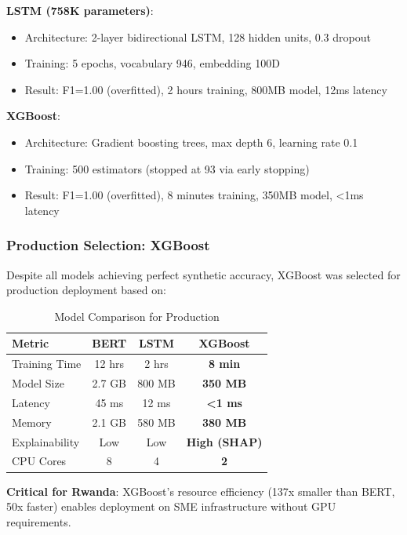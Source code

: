 \documentclass[11pt,conference]{IEEEtran}
\begin{document}
\textbf{LSTM (758K parameters)}:
\begin{itemize}
    \item Architecture: 2-layer bidirectional LSTM, 128 hidden units, 0.3 dropout
    \item Training: 5 epochs, vocabulary 946, embedding 100D
    \item Result: F1=1.00 (overfitted), 2 hours training, 800MB model, 12ms latency
\end{itemize}

\textbf{XGBoost}:
\begin{itemize}
    \item Architecture: Gradient boosting trees, max depth 6, learning rate 0.1
    \item Training: 500 estimators (stopped at 93 via early stopping)
    \item Result: F1=1.00 (overfitted), 8 minutes training, 350MB model, <1ms latency
\end{itemize}

\subsubsection{Production Selection: XGBoost}

Despite all models achieving perfect synthetic accuracy, XGBoost was selected for production deployment based on:

\begin{table}[h]
\centering
\caption{Model Comparison for Production}
\begin{tabular}{lccc}
\toprule
\textbf{Metric} & \textbf{BERT} & \textbf{LSTM} & \textbf{XGBoost} \\
\midrule
Training Time & 12 hrs & 2 hrs & \textbf{8 min} \\
Model Size & 2.7 GB & 800 MB & \textbf{350 MB} \\
Latency & 45 ms & 12 ms & \textbf{<1 ms} \\
Memory & 2.1 GB & 580 MB & \textbf{380 MB} \\
Explainability & Low & Low & \textbf{High (SHAP)} \\
CPU Cores & 8 & 4 & \textbf{2} \\
\bottomrule
\end{tabular}
\end{table}

\textbf{Critical for Rwanda}: XGBoost's resource efficiency (137x smaller than BERT, 50x faster) enables deployment on SME infrastructure without GPU requirements.
\end{document}
